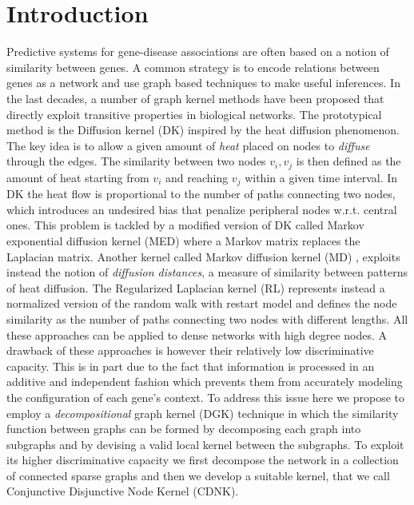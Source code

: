 \documentclass[review]{elsarticle}
\begin{document}
\section{Introduction}
Predictive systems for gene-disease associations are often based on a notion of similarity between genes. A common strategy is to encode relations between genes as a network and use graph based techniques to make useful inferences. In the last decades, a number of graph kernel methods have been proposed that directly exploit transitive properties in biological networks. The prototypical method is the Diffusion kernel (DK) \cite{kondor2002diffusion} inspired by the heat diffusion phenomenon. The key idea is to allow a given amount of {\em heat} placed on nodes to {\em diffuse} through the edges. The similarity between two nodes $v_{i}, v_{j}$ is then defined as the amount of heat starting from $v_{i}$ and reaching $v_{j}$ within a given time interval. In DK the heat flow is proportional to the number of paths connecting two nodes, which introduces an undesired bias that penalize peripheral nodes w.r.t. central ones. This problem is tackled by a modified version of DK called Markov exponential diffusion kernel (MED) \cite{chen2014disease} where a Markov matrix replaces the Laplacian matrix.  Another kernel called Markov diffusion kernel (MD) \cite{fouss2006experimental}, exploits instead the notion of {\em diffusion distances}, a measure of similarity between patterns of heat diffusion. The Regularized Laplacian kernel (RL) \cite{chebotarev2006matrix} represents instead a normalized version of the random walk with restart model and defines the node similarity as the number of paths connecting two nodes with different lengths. All these approaches can be applied to dense networks with high degree nodes. A drawback of these approaches is however their relatively low discriminative capacity. This is in part due to the fact that information is processed in an additive and independent fashion which prevents them from accurately modeling the configuration of each gene's context. To address this issue here we propose to employ a {\em decompositional} graph kernel (DGK) \cite{haussler1999convolution} technique in which the similarity function between graphs can be formed by decomposing each graph into subgraphs and by devising a valid local kernel between the subgraphs. To exploit its higher discriminative capacity we first decompose the network in a collection of connected sparse graphs and then we develop a suitable kernel, that we call Conjunctive Disjunctive Node Kernel (CDNK).
\end{document}

